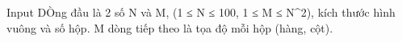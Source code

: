 Input
DÒng đầu là 2 số N và M,  (1 ≤ N ≤ 100, 1 ≤ M ≤ N^2), kích thước hình vuông và số hộp. M dòng tiếp theo là tọa độ mỗi hộp (hàng, cột).